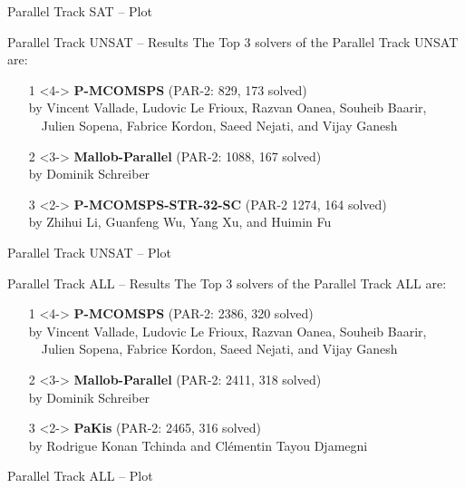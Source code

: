 \documentclass{beamer}
\begin{document}
\begin{frame}{Parallel Track SAT -- Plot}
\centering
{}
\end{frame}


\begin{frame}{Parallel Track UNSAT -- Results}
The Top 3 solvers of the Parallel Track UNSAT are:
\begin{itemize}

\item[1]<4-> {\bf P-MCOMSPS} (PAR-2: 829, 173 solved)\\
by Vincent Vallade, Ludovic Le Frioux, Razvan Oanea, Souheib Baarir, \\~~Julien Sopena, Fabrice Kordon, Saeed Nejati, and Vijay Ganesh
\item[2]<3-> {\bf Mallob-Parallel} (PAR-2: 1088, 167 solved)\\
by Dominik Schreiber
\item[3]<2-> {\bf P-MCOMSPS-STR-32-SC} (PAR-2 1274, 164 solved)\\
by Zhihui Li, Guanfeng Wu, Yang Xu, and Huimin Fu
\end{itemize}
\end{frame}


\begin{frame}{Parallel Track UNSAT -- Plot}
\centering
\resizebox{.9\textwidth}{!}{%

}
\end{frame}

\begin{frame}{Parallel Track ALL -- Results}
The Top 3 solvers of the Parallel Track ALL are:
\begin{itemize}
\item[1]<4-> {\bf P-MCOMSPS} (PAR-2: 2386, 320 solved)\\
by Vincent Vallade, Ludovic Le Frioux, Razvan Oanea, Souheib Baarir, \\~~Julien Sopena, Fabrice Kordon, Saeed Nejati, and Vijay Ganesh
\item[2]<3-> {\bf Mallob-Parallel} (PAR-2: 2411, 318 solved)\\
by Dominik Schreiber
\item[3]<2-> {\bf PaKis} (PAR-2: 2465, 316 solved)\\
by Rodrigue Konan Tchinda and Clémentin Tayou Djamegni
\end{itemize}
\end{frame}

\begin{frame}{Parallel Track ALL -- Plot}
\centering
\resizebox{.9\textwidth}{!}{%

}

\end{frame}
\end{document}
